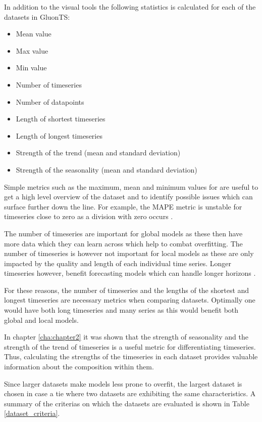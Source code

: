 In addition to the visual tools the following statistics is calculated for each of the datasets in GluonTS:

\begin{itemize}
  \item Mean value
  \item Max value
  \item Min value
  \item Number of timeseries
  \item Number of datapoints
  \item Length of shortest timeseries
  \item Length of longest timeseries
  \item Strength of the trend (mean and standard deviation)
  \item Strength of the seasonality (mean and standard deviation)
\end{itemize}

Simple metrics such as the maximum, mean and minimum values for are useful to get a high level overview of the dataset and to identify possible issues which can surface further down the line. For example, the MAPE metric is unstable for timeseries close to zero as a division with zero occurs \cite{hyndman_forecasting_3rd}.

The number of timeseries are important for global models as these then have more data which they can learn across which help to combat overfitting. The number of timeseries is however not important for local models as these are only impacted by the quality and length of each individual time series. Longer timeseries however, benefit forecasting models which can handle longer horizons \cite{makridakis_m4_2020}.

For these reasons, the number of timeseries and the lengths of the shortest and longest timeseries are necessary metrics when comparing datasets. Optimally one would have both long timeseries and many series as this would benefit both global and local models.

In chapter \ref{cha:chapter2} it was shown that the strength of seasonality and the strength of the trend of timeseries is a useful metric for differentiating timeseries. Thus, calculating the strengths of the timeseries in each dataset provides valuable information about the composition within them.

Since larger datasets make models less prone to overfit, the largest dataset is chosen in case a tie where two datasets are exhibiting the same characteristics. A summary of the criterias on which the datasets are evaluated is shown in Table \ref{dataset_criteria}.

